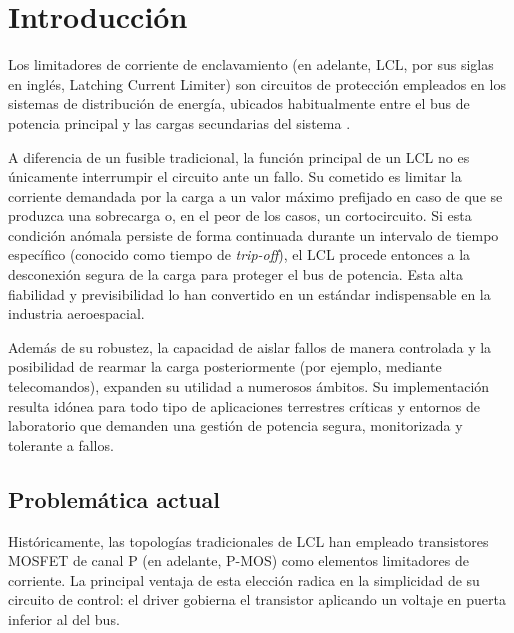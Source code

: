 \documentclass[12pt]{report} %
\begin{document}
\listoffigures
\thispagestyle{fancy}

\newpage %
\thispagestyle{empty}
\mbox{}

\listoftables
\thispagestyle{fancy}

\newpage %
\thispagestyle{empty}
\mbox{}

\clearpage
{} %

\chapter{Introducción}
Los limitadores de corriente de enclavamiento (en adelante, LCL, por sus siglas en inglés, Latching Current Limiter) son circuitos de protección empleados en los sistemas de distribución de energía, ubicados habitualmente entre el bus de potencia principal y las cargas secundarias del sistema \cite{noauthor_latching_nodate}.

A diferencia de un fusible tradicional, la función principal de un LCL no es únicamente interrumpir el circuito ante un fallo. Su cometido es limitar la corriente demandada por la carga a un valor máximo prefijado en caso de que se produzca una sobrecarga o, en el peor de los casos, un cortocircuito. Si esta condición anómala persiste de forma continuada durante un intervalo de tiempo específico (conocido como tiempo de \textit{trip-off}), el LCL procede entonces a la desconexión segura de la carga para proteger el bus de potencia. Esta alta fiabilidad y previsibilidad lo han convertido en un estándar indispensable en la industria aeroespacial.

Además de su robustez, la capacidad de aislar fallos de manera controlada y la posibilidad de rearmar la carga posteriormente (por ejemplo, mediante telecomandos), expanden su utilidad a numerosos ámbitos. Su implementación resulta idónea para todo tipo de aplicaciones terrestres críticas y entornos de laboratorio que demanden una gestión de potencia segura, monitorizada y tolerante a fallos.

\section{Problemática actual}
Históricamente, las topologías tradicionales de LCL han empleado transistores MOSFET de canal P (en adelante, P-MOS) como elementos limitadores de corriente. La principal ventaja de esta elección radica en la simplicidad de su circuito de control: el driver gobierna el transistor aplicando un voltaje en puerta inferior al del bus.
\end{document}
